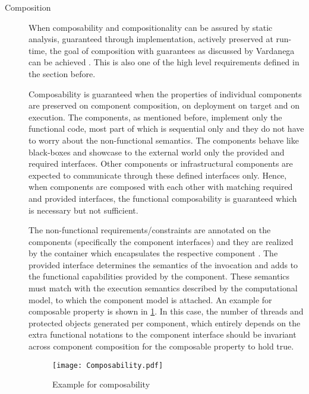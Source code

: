\begin{description}
\item [Composition] 
\label{section: Founding principle-Composition}
When composability and compositionality can be assured by static analysis, guaranteed through implementation, actively preserved at run-time, the goal of composition with guarantees as discussed by Vardanega can be achieved \cite{CompBasedProcess}. This is also one of the high level requirements defined in the section before.
 
Composability is guaranteed when the properties of individual components are preserved on component composition, on deployment on target and on execution. The components, as mentioned before, implement only the functional code, most part of which is sequential only and they do not have to worry about the non-functional semantics. The components behave like black-boxes and showcase to the external world only the provided and required interfaces. Other components or infrastructural components are expected to communicate through these defined interfaces only. Hence, when components are composed with each other with matching required and provided interfaces, the functional composability is guaranteed which is necessary but not sufficient.

The non-functional requirements/constraints are annotated on the components (specifically the component interfaces) and they are realized by the container which encapsulates the respective component \cite{SAVOIR}\cite{ComponentModel}. The provided interface determines the semantics of the invocation and adds to the functional capabilities provided by the component. These semantics must match with the execution semantics described by the computational model, to which the component model is attached. An example for composable property is shown in \cref{fig: Composability}. In this case, the number of threads and protected objects generated per component, which entirely depends on the extra functional notations to the component interface should be invariant across component composition for the composable property to hold true.  

\begin{figure}[h]
	\centering
	\texttt{[image: Composability.pdf]}
	\caption{Example for composability}
	\label{fig: Composability}
\end{figure}


\end{description}

